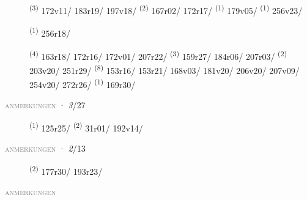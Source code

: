 \begin{description}
    \item[]  \textsuperscript{(3)} \mbox{172v11/} \mbox{183r19/} \mbox{197v18/} \CASEBREAK {} \textsuperscript{(2)} \mbox{167r02/} \mbox{172r17/} \textsuperscript{(1)} \mbox{179v05/} \textsuperscript{(1)} \mbox{256v23/}
    \item[]  \textsuperscript{(1)} \mbox{256r18/}
    \item[]  \textsuperscript{(4)} \mbox{163r18/} \mbox{172r16/} \mbox{172v01/} \mbox{207r22/} \CASEBREAK {} \textsuperscript{(3)} \mbox{159r27/} \mbox{184r06/} \mbox{207r03/} \CASEBREAK {} \textsuperscript{(2)} \mbox{203v20/} \mbox{251r29/} \CASEBREAK {} \textsuperscript{(8)} \mbox{153r16/} \mbox{153r21/} \mbox{168v03/} \mbox{181v20/} \mbox{206v20/} \mbox{207v09/} \mbox{254v20/} \mbox{272r26/} \textsuperscript{(1)} \mbox{169r30/}
\end{description}
\textsc{\textcolor{gray}{anmerkungen}}
\ENTRYEND
\noindent{} · \textit{3}/27 \LEMMALINE
\begin{description}
    \item[]  \textsuperscript{(1)} \mbox{125r25/} \CASEBREAK {} \textsuperscript{(2)} \mbox{31r01/} \mbox{192v14/}
\end{description}
\textsc{\textcolor{gray}{anmerkungen}}
\ENTRYEND
\noindent{} · \textit{2}/13 \LEMMALINE
\begin{description}
    \item[]  \textsuperscript{(2)} \mbox{177r30/} \mbox{193r23/}
\end{description}
\textsc{\textcolor{gray}{anmerkungen}}
\ENTRYEND
